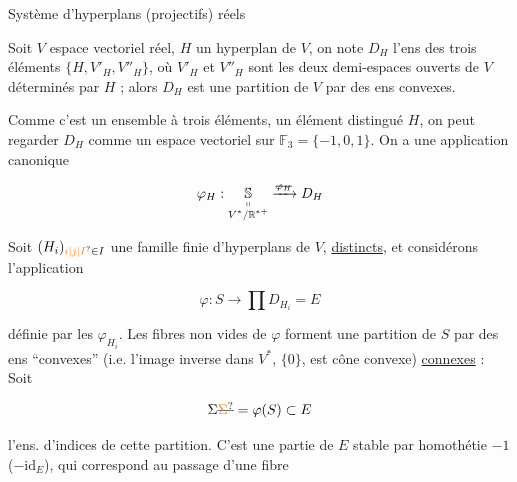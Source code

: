 {\begin{tikzpicture}[x=.00815cm,y=-.00815cm,line cap=round,line join=round,inner sep=.4pt]
\end{tikzpicture}}

Système d'hyperplans (projectifs) réels


Soit $V$ espace vectoriel réel, $H$ un hyperplan de $V$, on note $D_H$  l'ens des trois éléments  $\{H,V'_H,V''_H\}$, où $V'_H$ et $V''_H$ sont les deux demi-espaces ouverts de $V$ déterminés par $H$ ;  alors  $D_H$ est une partition de $V$ par des ens convexes.

Comme c'est un ensemble à trois éléments, un élément distingué \deleted{$\{$}$H$\deleted{$\}$}, on peut regarder $D_H$ comme un espace vectoriel sur $\mathbb F_3=\{-1,0,1\}$. On a une application canonique


\[
\varphi_H:\underset{\substack{\shortparallel\\ V^*/\mathbb R^{*+}}}{\mathbb S}\xrightarrow{\deleted{\varphi_H}}D_H
\]

Soit $(H_i)_{\unsure{i|j|I}\in I}$ une famille finie d'hyperplans de $V$, \uline{distincts}, et considérons l'application


\[
\varphi:S\longrightarrow\prod D_{H_i}=E
\]

définie par les $\varphi_{H_i}$. Les fibres non vides de $\varphi$ forment une partition de $S$ par des  ens ``convexes'' (i.e. l'image inverse dans $V^*$,  $\{0\}$, est   cône convexe) \uline{} \uline{connexes} :  Soit


\[
\Sigma\deleted{\unsure{\Sigma}}=\varphi(S)\subset E
\]

l'ens. d'indices de cette partition. C'est une partie de $E$ stable par  homothétie $-1$ ($-\mathrm{id}_E$), qui correspond au passage  d'une fibre

